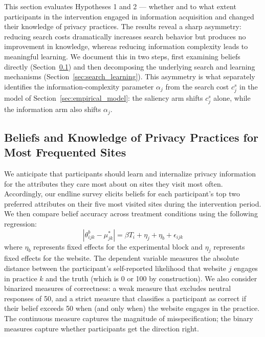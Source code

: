 \documentclass[12pt]{article}
\theoremstyle{definition}
\theoremstyle{remark}
\begin{document}
This section evaluates Hypotheses 1 and 2 --- whether and to what extent participants in the intervention engaged in information acquisition and changed their knowledge of privacy practices. The results reveal a sharp asymmetry: reducing search costs dramatically increases search behavior but produces no improvement in knowledge, whereas reducing information complexity leads to meaningful learning. We document this in two steps, first examining beliefs directly (Section~\ref{sec:knowledge_top_sites}) and then decomposing the underlying search and learning mechanisms (Section~\ref{sec:search_learning}). This asymmetry is what separately identifies the information-complexity parameter $\alpha_j$ from the search cost $c^s_j$ in the model of Section~\ref{sec:empirical_model}: the saliency arm shifts $c^s_j$ alone, while the information arm also shifts $\alpha_j$.
 
\subsection{Beliefs and Knowledge of Privacy Practices for Most Frequented Sites}\label{sec:knowledge_top_sites}

We anticipate that participants should learn and internalize privacy information for the attributes they care most about on sites they visit most often. Accordingly, our endline survey elicits beliefs for each participant's top two preferred attributes on their five most visited sites during the intervention period. We then compare belief accuracy across treatment conditions using the following regression:
\begin{equation}\label{eq:belief_correctness}
|\theta^b_{ijk} - \mu^*_{jk}| = \beta T_i + \eta_j + \eta_b + \epsilon_{ijk}
\end{equation}
where $\eta_b$ represents fixed effects for the experimental block and $\eta_j$ represents fixed effects for the website. The dependent variable measures the absolute distance between the participant's self-reported likelihood that website $j$ engages in practice $k$ and the truth (which is 0 or 100 by construction). We also consider binarized measures of correctness: a weak measure that excludes neutral responses of 50, and a strict measure that classifies a participant as correct if their belief exceeds 50 when (and only when) the website engages in the practice. The continuous measure captures the magnitude of misspecification; the binary measures capture whether participants get the direction right.
\end{document}
